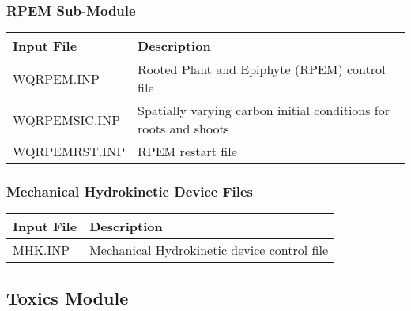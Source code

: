 \documentclass[letterpaper,10pt,english]{sphinxmanual}
\begin{document}
\subsubsection{RPEM Sub-Module}
\label{\detokenize{inputfiles/eutro:rpem-sub-module}}

\begin{savenotes}\sphinxattablestart
\centering
\begin{tabulary}{\linewidth}[t]{|T|T|}
\hline
\sphinxstyletheadfamily 
Input File
&\sphinxstyletheadfamily 
Description
\\
\hline
WQRPEM.INP
&
Rooted Plant and Epiphyte (RPEM) control file
\\
\hline
WQRPEMSIC.INP
&
Spatially varying carbon initial conditions for roots and shoots
\\
\hline
WQRPEMRST.INP
&
RPEM restart file
\\
\hline
\end{tabulary}
\par
\sphinxattableend\end{savenotes}


\subsubsection{Mechanical Hydrokinetic Device Files}
\label{\detokenize{inputfiles/eutro:mechanical-hydrokinetic-device-files}}

\begin{savenotes}\sphinxattablestart
\centering
\begin{tabulary}{\linewidth}[t]{|T|T|}
\hline
\sphinxstyletheadfamily 
Input File
&\sphinxstyletheadfamily 
Description
\\
\hline
MHK.INP
&
Mechanical Hydrokinetic device control file
\\
\hline
\end{tabulary}
\par
\sphinxattableend\end{savenotes}


\subsection{Toxics Module}
\label{\detokenize{inputfiles/toxics:toxics-module}}\label{\detokenize{inputfiles/toxics:toxics}}\label{\detokenize{inputfiles/toxics::doc}}
\end{document}
